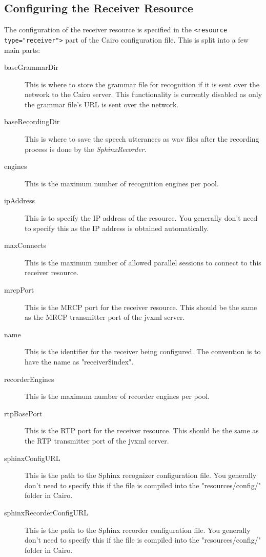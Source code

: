 \subsection{Configuring the Receiver Resource}
The configuration of the receiver resource is specified in the \lstinline$<resource type="receiver">$ part of the Cairo configuration file.
This is split into a few main parts:
\begin{description}
  \item[baseGrammarDir] This is where to store the grammar file for recognition if it is sent over the network to the Cairo server. This functionality is currently disabled as only the grammar file's URL is sent over the network.
  \item[baseRecordingDir] This is where to save the speech utterances as wav files after the recording process is done by the \textit{SphinxRecorder}. 
  \item[engines] This is the maximum number of recognition engines per pool.
  \item[ipAddress] This is to specify the IP address of the resource. You generally don't need to specify this as the IP address is obtained automatically.
  \item[maxConnects] This is the maximum number of allowed parallel sessions to connect to this receiver resource.
  \item[mrcpPort] This is the MRCP port for the receiver resource. This should be the same as the MRCP transmitter port of the \ac{jvxml} server.
  \item[name] This is the identifier for the receiver being configured. The convention is to have the name as "receiver\$index".
  \item[recorderEngines] This is the maximum number of recorder engines per pool.
  \item[rtpBasePort] This is the RTP port for the receiver resource. This should be the same as the RTP transmitter port of the \ac{jvxml} server.
  \item[sphinxConfigURL] This is the path to the Sphinx recognizer configuration file. You generally don't need to specify this if the file is compiled into the "resources/config/" folder in Cairo.
  \item[sphinxRecorderConfigURL] This is the path to the Sphinx recorder configuration file. You generally don't need to specify this if the file is compiled into the "resources/config/" folder in Cairo. 
\end{description}

